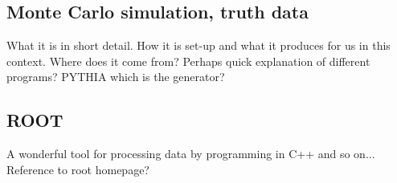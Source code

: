 \subsection{Monte Carlo simulation, truth data}
What it is in short detail. How it is set-up and what it produces for us in this context. 
Where does it come from? Perhaps quick explanation of different programs?
PYTHIA which is the generator? \citep{Sjostrand:2008}
\subsection{ROOT}
A wonderful tool for processing data by programming in C++ and so on... Reference to root homepage?